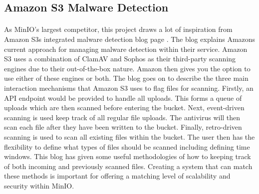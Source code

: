 \documentclass[12pt, conference, final, a4paper, onecolumn, compsoc]{IEEEtran}
\begin{document}


    \subsection*{Amazon S3 Malware Detection} %
    \paragraph{}

    As MinIO's largest competitor, this project draws a lot of inspiration from
    Amazon S3s integrated malware detection blog page \citep{amazon-md}. The
    blog explains Amazons current approach for managing malware detection within
    their service. Amazon S3 uses a combination of ClamAV and Sophos as their
    third-party scanning engines due to their out-of-the-box nature. Amazon then
    gives you the option to use either of these engines or both. The blog goes
    on to describe the three main interaction mechanisms that Amazon S3 uses to
    flag files for scanning. Firstly, an API endpoint would be provided to
    handle all uploads. This forms a queue of uploads which are then scanned
    before entering the bucket. Next, event-driven scanning is used keep track
    of all regular file uploads. The antivirus will then scan each file after
    they have been written to the bucket. Finally, retro-driven scanning is used
    to scan all existing files within the bucket. The user then has the
    flexibility to define what types of files should be scanned including
    defining time windows. This blog has given some useful methodologies of how
    to keeping track of both incoming and previously scanned files. Creating a
    system that can match these methods is important for offering a matching
    level of scalability and security within MinIO.



    \subsection*{} %


    \subsection*{} %
\end{document}
